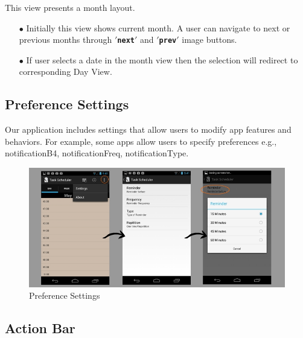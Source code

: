 \documentclass[10pt,a4paper]{report}
\begin{document}
This view presents a month layout.

\begin{itemize}
  \item[$\bullet$] Initially this view shows current month. A user can navigate to next or previous months through \textbf{\texttt{$'$next$'$}} and \textbf{\texttt{$'$prev$'$}} image buttons.
  \item[$\bullet$] If user selects a date in the month view then the selection will redirect to corresponding Day View.
\end{itemize}

\subsection{Preference Settings}
 Our application includes settings that allow users to modify app features and behaviors. For example, some apps allow users to specify preferences e.g., notificationB4, notificationFreq, notificationType. \\




\begin{figure}[h!]
\begin{center}
\includegraphics[scale=0.5]{settings.jpg}  
\end{center}
\caption{Preference Settings}
\label{hd}
\end{figure}

\subsection{Action Bar}
\end{document}
